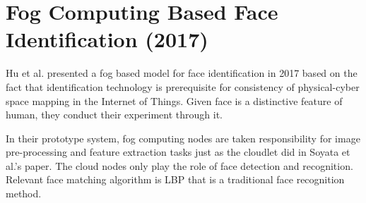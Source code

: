 \section{Fog Computing Based Face Identification (2017)}

Hu et al. presented a fog based model for face identification in 2017 based on the fact that identification technology is prerequisite for consistency of physical-cyber space mapping in the Internet of Things. Given face is a distinctive feature of human, they conduct their experiment through it. 

In their prototype system, fog computing nodes are taken responsibility for image pre-processing and feature extraction tasks just as the cloudlet did in Soyata et al.'s paper. The cloud nodes only play the role of face detection and recognition. Relevant face matching algorithm is LBP that is a traditional face recognition method.
